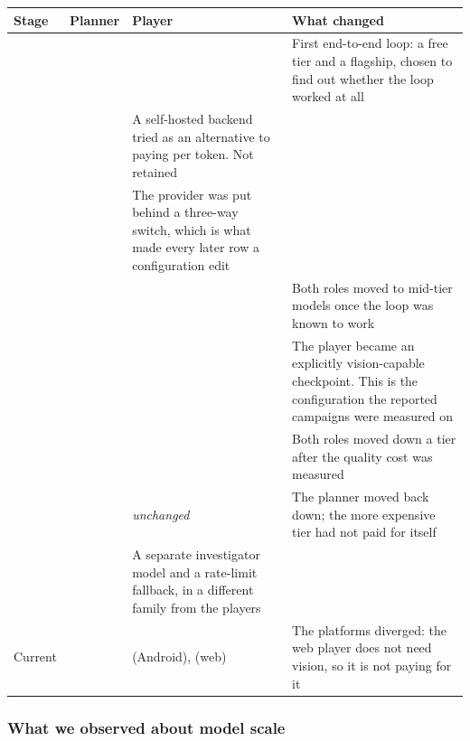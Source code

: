 \begin{table}[H]
  \centering\footnotesize
  \setlength{\tabcolsep}{4pt}
  \begin{tabularx}{\textwidth}{@{}>{\hsize}Y>{\hsize}Y>{\hsize}Y>{\hsize}Y@{}}
    \toprule
    Stage & Planner & Player & What changed \\
     &  &  & First end-to-end loop: a free tier and a flagship, chosen to find out whether the loop worked at all \\
     &  & A self-hosted backend tried as an alternative to paying per token. Not retained \\
     &  & The provider was put behind a three-way switch, which is what made every later row a configuration edit \\
     &  &  & Both roles moved to mid-tier models once the loop was known to work \\
     &  &  & The player became an explicitly vision-capable checkpoint. This is the configuration the reported campaigns were measured on \\
     &  &  & Both roles moved down a tier after the quality cost was measured \\
     &  & \textit{unchanged} & The planner moved back down; the more expensive tier had not paid for itself \\
     &  & A separate investigator model and a rate-limit fallback, in a different family from the players \\
    \addlinespace
    Current &  &  (Android),  (web) & The platforms diverged: the web player does not need vision, so it is not paying for it \\
    \bottomrule
  \end{tabularx}
\end{table}

\subsubsection{What we observed about model scale}

